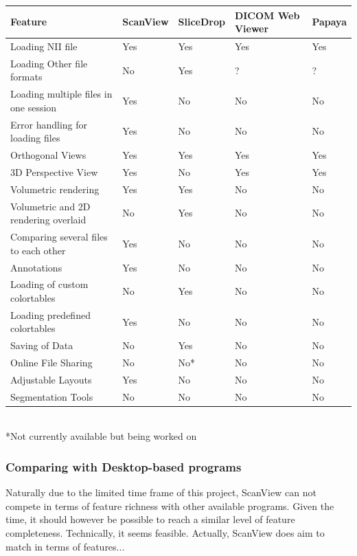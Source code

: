 \documentclass[a4paper,11pt,twoside]{article}
\begin{document}
\begin{center}

  \begin{tabular}{ | l | l | l | l | l |}
    \hline
    Feature & ScanView & SliceDrop & DICOM Web Viewer & Papaya \\ \hline \hline

Loading NII file & Yes & Yes & Yes & Yes\\ \hline
Loading Other file formats & No & Yes & ? & ?\\ \hline
Loading multiple files in one session & Yes & No & No & No \\ \hline
Error handling for loading files & Yes & No & No & No\\ \hline
Orthogonal Views & Yes & Yes & Yes & Yes\\ \hline
3D Perspective View & Yes & No & Yes & Yes \\ \hline
Volumetric rendering & Yes & Yes & No & No\\ \hline
Volumetric and 2D rendering overlaid & No & Yes & No & No \\ \hline
Comparing several files to each other & Yes & No & No & No\\ \hline
Annotations & Yes & No & No & No\\ \hline
Loading of custom colortables & No & Yes & No & No \\ \hline
Loading predefined colortables & Yes & No & No & No\\ \hline
Saving of Data & No & Yes & No & No\\ \hline
Online File Sharing & No & No* & No & No\\ \hline
Adjustable Layouts & Yes & No & No & No \\ \hline
Segmentation Tools & No & No & No & No \\ \hline

  \end{tabular}\\



*Not currently available but being worked on


\end{center}



\subsubsection{Comparing with Desktop-based programs}

Naturally due to the limited time frame of this project, ScanView can not compete in terms of feature richness with other available programs. Given the time, it should however be possible to reach a similar level of feature completeness. Technically, it seems feasible. Actually, ScanView does aim to match in terms of features...
\end{document}
